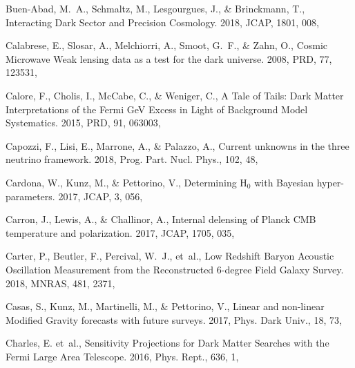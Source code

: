 \documentclass[longauth,traditabstract]{aa}
\def\mnras{{MNRAS}}
\def\prd{{PRD}}
\def\jcap{{JCAP}}
\begin{document}
\begin{thebibliography}{379}
Buen-Abad, M.~A., Schmaltz, M., Lesgourgues, J., \& Brinckmann, T.,
  {Interacting Dark Sector and Precision Cosmology}. 2018, JCAP, 1801, 008,

Calabrese, E., Slosar, A., Melchiorri, A., Smoot, G.~F., \& Zahn, O., {Cosmic
  Microwave Weak lensing data as a test for the dark universe}. 2008, \prd, 77,
  123531, 

Calore, F., Cholis, I., McCabe, C., \& Weniger, C., {A Tale of Tails: Dark
  Matter Interpretations of the Fermi GeV Excess in Light of Background Model
  Systematics}. 2015, \prd, 91, 063003, 

Capozzi, F., Lisi, E., Marrone, A., \& Palazzo, A., {Current unknowns in the
  three neutrino framework}. 2018, Prog. Part. Nucl. Phys., 102, 48,

{Cardona}, W., {Kunz}, M., \& {Pettorino}, V., {Determining H$_{0}$ with
  Bayesian hyper-parameters}. 2017, \jcap, 3, 056, 

Carron, J., Lewis, A., \& Challinor, A., {Internal delensing of Planck CMB
  temperature and polarization}. 2017, \jcap, 1705, 035, 

Carter, P., Beutler, F., Percival, W.~J., {et~al.}, {Low Redshift Baryon
  Acoustic Oscillation Measurement from the Reconstructed 6-degree Field Galaxy
  Survey}. 2018, \mnras, 481, 2371, 

Casas, S., Kunz, M., Martinelli, M., \& Pettorino, V., {Linear and non-linear
  Modified Gravity forecasts with future surveys}. 2017, Phys. Dark Univ., 18,
  73, 

Charles, E. {et~al.}, {Sensitivity Projections for Dark Matter Searches with
  the Fermi Large Area Telescope}. 2016, Phys. Rept., 636, 1,


\end{thebibliography}
\end{document}
